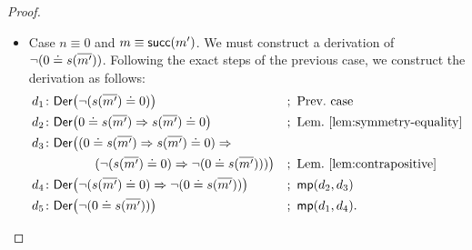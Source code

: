 \begin{proof}
\begin{enumerate}[a),font=\upshape]
\begin{itemize}
            \item Case $n\equiv0$ and $m\equiv\mathsf{succ}(m')$. We must construct a derivation of $\neg(0\doteq s({\overline{m'}}))$. Following the exact steps of the previous case, we construct the derivation as follows:
            {\small
            \begin{align*}
                d_1&\colon\fun{Der}\bigl(
                    \neg(s(\num{m'})\doteq0)
                \bigr)
                    &&;\ \text{Prev.~case}\\
                d_2&\colon\fun{Der}\bigl(
                    0\doteq s(\num{m'})
                    \imp
                    s(\num{m'})\doteq0
                \bigr)
                    &&;\ \text{Lem.~\ref{lem:symmetry-equality}}\\
                d_3&\colon\fun{Der}\bigl(
                    (
                        0\doteq s(\num{m'})
                        \imp
                        s(\num{m'})\doteq0
                    )
                    \imp\\
                    &\qquad\qquad(
                        \neg(s(\num{m'})\doteq0)
                        \imp
                        \neg(0\doteq s(\num{m'}))
                    )
                \bigr)
                    &&;\ \text{Lem.~\ref{lem:contrapositive}}\\
                d_4&\colon\fun{Der}\bigl(
                    \neg(s(\num{m'})\doteq0)
                    \imp
                    \neg(0\doteq s(\num{m'}))
                \bigr)
                    &&;\ \fun{mp}(d_2,d_3)\\
                d_5&\colon\fun{Der}\bigl(
                    \neg(0\doteq s(\num{m'}))
                \bigr)
                    &&;\ \fun{mp}(d_1,d_4).
            \end{align*}}
            

\end{itemize}
\end{enumerate}
\end{proof}
